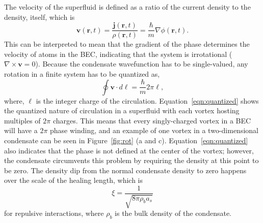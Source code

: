 The velocity of the superfluid is defined as a ratio of the current density to the density, itself, which is
\begin{equation}
\mathbf{v}(\mathbf{r},t)=\frac{\mathbf{j}(\mathbf{r},t)}{\rho(\mathbf{r},t)} = \frac{\hbar}{m}\nabla\phi(\mathbf{r},t).
\end{equation}
\noindent This can be interpreted to mean that the gradient of the phase determines the velocity of atoms in the BEC, indicating that the system is irrotational ($\nabla \times \mathbf{v} = 0$).
Because the condensate wavefunction has to be single-valued, any rotation in a finite system has to be quantized as,
\begin{equation}
\oint \mathbf{v} \cdot d\ell = \frac{\hbar}{m}2\pi\ell,
\label{eqn:quantized}
\end{equation}
\noindent where, $\ell$ is the integer charge of the circulation.
Equation~\eqref{eqn:quantized} shows the quantized nature of circulation in a superfluid with each vortex hosting multiples of $2\pi$ charges.
This means that every singly-charged vortex in a BEC will have a $2\pi$ phase winding, and an example of one vortex in a two-dimensional condensate can be seen in Figure~\ref{fig:rot} (a and c).
Equation~\eqref{eqn:quantized} also indicates that the phase is not defined at the center of the vortex; however, the condensate circumvents this problem by requiring the density at this point to be zero.
The density dip from the normal condensate density to zero happens over the scale of the healing length, which is
\begin{equation}
\xi=\frac{1}{\sqrt{8\pi\rho_ba_s}}
\end{equation}
\noindent for repulsive interactions, where $\rho_b$ is the bulk density of the condensate.

